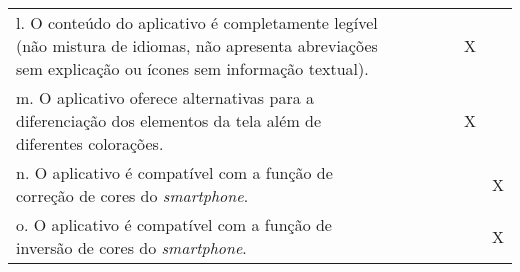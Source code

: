 \documentclass[portuguese,oneside]{tcc}
\begin{document}
\begin{center}
\begin{longtabu}{|L{25em}|c|c|c|c|c|c|}
																						l. O conteúdo do aplicativo é completamente legível (não mistura de idiomas, não apresenta abreviações sem explicação ou ícones sem informação textual). & & & & & X & \\ 
																						m. O aplicativo oferece alternativas para a diferenciação dos elementos da tela além de diferentes colorações. & & & & & X & \\ 
																						n. O aplicativo é compatível com a função de correção de cores do \emph{smartphone}. & & & & & & X \\ 
																						o. O aplicativo é compatível com a função de inversão de cores do \emph{smartphone}. & & & & & & X \\ 
																					\end{longtabu}
																				\end{center}
																				
\end{document}
